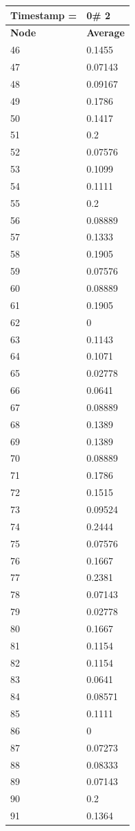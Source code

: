 \begin{tabular}{|l||l|}
\hline
\textbf{Timestamp =} & \textbf{0}\# 2\\\hline
	\textbf{Node} & \textbf{Average} \\ \hline
\hline
	46 & 0.1455 \\ \hline
	47 & 0.07143 \\ \hline
	48 & 0.09167 \\ \hline
	49 & 0.1786 \\ \hline
	50 & 0.1417 \\ \hline
	51 & 0.2 \\ \hline
	52 & 0.07576 \\ \hline
	53 & 0.1099 \\ \hline
	54 & 0.1111 \\ \hline
	55 & 0.2 \\ \hline
	56 & 0.08889 \\ \hline
	57 & 0.1333 \\ \hline
	58 & 0.1905 \\ \hline
	59 & 0.07576 \\ \hline
	60 & 0.08889 \\ \hline
	61 & 0.1905 \\ \hline
	62 & 0 \\ \hline
	63 & 0.1143 \\ \hline
	64 & 0.1071 \\ \hline
	65 & 0.02778 \\ \hline
	66 & 0.0641 \\ \hline
	67 & 0.08889 \\ \hline
	68 & 0.1389 \\ \hline
	69 & 0.1389 \\ \hline
	70 & 0.08889 \\ \hline
	71 & 0.1786 \\ \hline
	72 & 0.1515 \\ \hline
	73 & 0.09524 \\ \hline
	74 & 0.2444 \\ \hline
	75 & 0.07576 \\ \hline
	76 & 0.1667 \\ \hline
	77 & 0.2381 \\ \hline
	78 & 0.07143 \\ \hline
	79 & 0.02778 \\ \hline
	80 & 0.1667 \\ \hline
	81 & 0.1154 \\ \hline
	82 & 0.1154 \\ \hline
	83 & 0.0641 \\ \hline
	84 & 0.08571 \\ \hline
	85 & 0.1111 \\ \hline
	86 & 0 \\ \hline
	87 & 0.07273 \\ \hline
	88 & 0.08333 \\ \hline
	89 & 0.07143 \\ \hline
	90 & 0.2 \\ \hline
	91 & 0.1364 \\ \hline
\end{tabular}
